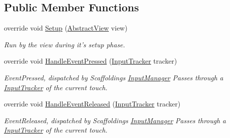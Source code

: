 \subsection*{Public Member Functions}
\begin{DoxyCompactItemize}
\item 
override void \hyperlink{class_scaffolding_1_1_pinch_this_input_a60b5bc5461de1286d8bd142742451dab}{Setup} (\hyperlink{class_scaffolding_1_1_abstract_view}{Abstract\-View} view)
\begin{DoxyCompactList}\small\item\em Run by the view during it's setup phase. \end{DoxyCompactList}\item 
override void \hyperlink{class_scaffolding_1_1_pinch_this_input_a00f941bc53b1847a2be7a2e61a4a9a57}{Handle\-Event\-Pressed} (\hyperlink{class_scaffolding_1_1_input_tracker}{Input\-Tracker} tracker)
\begin{DoxyCompactList}\small\item\em Event\-Pressed, dispatched by Scaffoldings \hyperlink{class_scaffolding_1_1_input_manager}{Input\-Manager} Passes through a \hyperlink{class_scaffolding_1_1_input_tracker}{Input\-Tracker} of the current touch. \end{DoxyCompactList}\item 
override void \hyperlink{class_scaffolding_1_1_pinch_this_input_ad9ca7c0e4b14d3d59ff06b258b4b9f7d}{Handle\-Event\-Released} (\hyperlink{class_scaffolding_1_1_input_tracker}{Input\-Tracker} tracker)
\begin{DoxyCompactList}\small\item\em Event\-Released, dispatched by Scaffoldings \hyperlink{class_scaffolding_1_1_input_manager}{Input\-Manager} Passes through a \hyperlink{class_scaffolding_1_1_input_tracker}{Input\-Tracker} of the current touch. \end{DoxyCompactList}\end{DoxyCompactItemize}
